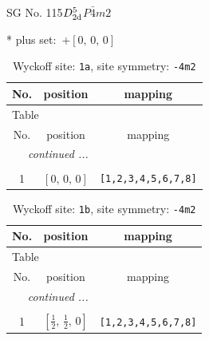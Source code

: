 \documentclass[fleqn,8pt]{jsarticle}
\begin{document}
\setcounter{MaxMatrixCols}{32}

\renewcommand{\tablename}{Table~}
\renewcommand{\figurename}{Figure~}
\begin{center}
\LARGE
SG No. 115\quad$D_{\rm 2d}^{5}$\quad$P\bar{4}m2$\quad[ tetragonal ]
\end{center}
* plus set:\,\,\,$+\left[ 0,\, 0,\, 0 \right]$
\renewcommand{\arraystretch}{1.2}
\begin{longtable}{ccc}
\caption{Wyckoff site: {\tt 1a}, site symmetry: {\tt -4m2}}
 \\
 \hline \hline
No. & position & mapping \\ \hline \endfirsthead

\multicolumn{2}{l}{\tablename\ \thetable{}} \\
 \hline \hline
No. & position & mapping \\ \hline \endhead

 \hline \hline
\multicolumn{2}{r}{\footnotesize\it continued ...} \\ \endfoot

 \hline \hline
\multicolumn{2}{r}{} \\ \endlastfoot

1 & $\left[ 0,\, 0,\, 0 \right]$ & {\tt [1,2,3,4,5,6,7,8]} \\
\end{longtable}
\renewcommand{\arraystretch}{1.2}
\begin{longtable}{ccc}
\caption{Wyckoff site: {\tt 1b}, site symmetry: {\tt -4m2}}
 \\
 \hline \hline
No. & position & mapping \\ \hline \endfirsthead

\multicolumn{2}{l}{\tablename\ \thetable{}} \\
 \hline \hline
No. & position & mapping \\ \hline \endhead

 \hline \hline
\multicolumn{2}{r}{\footnotesize\it continued ...} \\ \endfoot

 \hline \hline
\multicolumn{2}{r}{} \\ \endlastfoot

1 & $\left[ \frac{1}{2},\, \frac{1}{2},\, 0 \right]$ & {\tt [1,2,3,4,5,6,7,8]} \\
\end{longtable}
\renewcommand{\arraystretch}{1.2}
\end{document}
